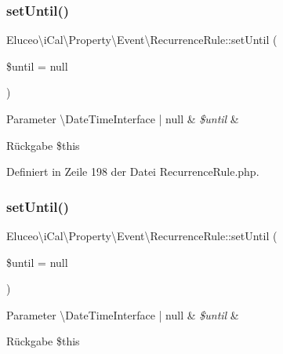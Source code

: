 \subsubsection{\texorpdfstring{set\+Until()}{setUntil()}\hspace{0.1cm}{\footnotesize\ttfamily [1/3]}}
{\footnotesize\ttfamily Eluceo\textbackslash{}i\+Cal\textbackslash{}\+Property\textbackslash{}\+Event\textbackslash{}\+Recurrence\+Rule\+::set\+Until (\begin{DoxyParamCaption}\item[{\textbackslash{}Date\+Time\+Interface}]{\$until = {\ttfamily null} }\end{DoxyParamCaption})}


\begin{DoxyParams}[1]{Parameter}
\textbackslash{}\+Date\+Time\+Interface | null & {\em \$until} & \\
\hline
\end{DoxyParams}
\begin{DoxyReturn}{Rückgabe}
\$this 
\end{DoxyReturn}


Definiert in Zeile 198 der Datei Recurrence\+Rule.\+php.

\mbox{\label{class_eluceo_1_1i_cal_1_1_property_1_1_event_1_1_recurrence_rule_a4734805877b1b97c7fd0be51e76652f5}} 
\subsubsection{\texorpdfstring{set\+Until()}{setUntil()}\hspace{0.1cm}{\footnotesize\ttfamily [2/3]}}
{\footnotesize\ttfamily Eluceo\textbackslash{}i\+Cal\textbackslash{}\+Property\textbackslash{}\+Event\textbackslash{}\+Recurrence\+Rule\+::set\+Until (\begin{DoxyParamCaption}\item[{\textbackslash{}Date\+Time\+Interface}]{\$until = {\ttfamily null} }\end{DoxyParamCaption})}


\begin{DoxyParams}[1]{Parameter}
\textbackslash{}\+Date\+Time\+Interface | null & {\em \$until} & \\
\hline
\end{DoxyParams}
\begin{DoxyReturn}{Rückgabe}
\$this 
\end{DoxyReturn}


